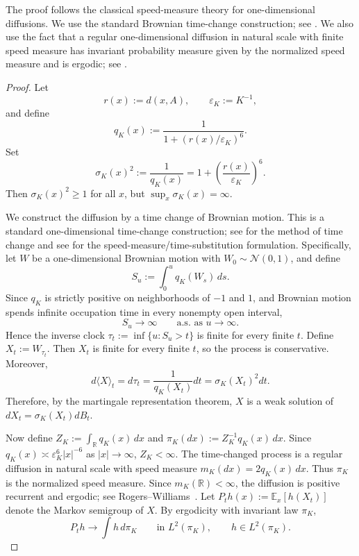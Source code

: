 \documentclass{article}
\newcommand{\1}{\mathbbm{1}}
\numberwithin{equation}{section}
\def\to{\rightarrow}
\begin{document}
The proof follows the classical
speed-measure theory for one-dimensional diffusions. We use the standard
Brownian time-change construction; see 
\cite[Ch.~5, \S5.5A]{KaratzasShreve1991}. We also use the fact that a
regular one-dimensional diffusion in natural scale with finite speed measure
has invariant probability measure given by the normalized speed measure and is
ergodic; see  \cite[Ch.~V, \S\S47,53]{RogersWilliams2000}.

\begin{proof}
Let
$$
r(x):=d(x,A),
\qquad
\varepsilon_K:=K^{-1},
$$
and define
$$
q_K(x):=\frac{1}{1+(r(x)/\varepsilon_K)^6}.
$$
Set
$$
\sigma_K(x)^2:=\frac{1}{q_K(x)}
=
1+\left(\frac{r(x)}{\varepsilon_K}\right)^6.
$$
Then $\sigma_K(x)^2\ge 1$ for all $x$, but $\sup_x \sigma_K(x)=\infty$.

We construct the diffusion by a time change of Brownian motion. This is a standard one-dimensional time-change construction; see
\cite[Ch.~5, \S5.5A]{KaratzasShreve1991} for the
method of time change and see \cite[Ch.~V, \S47]{RogersWilliams2000}
for the speed-measure/time-substitution formulation. Specifically, let $W$ be a one-dimensional Brownian motion with $W_0\sim \mathcal N(0,1)$, and define
$$
S_u:=\int_0^u q_K(W_s)\,ds.
$$
Since $q_K$ is strictly positive on neighborhoods of $-1$ and $1$, and Brownian motion spends infinite occupation time in every nonempty open interval,
$$
S_u\to\infty
\qquad
\text{a.s. as }u\to\infty.
$$
Hence the inverse clock
$
\tau_t:=\inf\{u:S_u>t\}
$
is finite for every finite $t$. Define
$
X_t:=W_{\tau_t}.
$
Then $X_t$ is finite for every finite $t$, so the process is conservative. Moreover,
$$
d\langle X\rangle_t
=
d\tau_t
=
\frac{1}{q_K(X_t)}dt
=
\sigma_K(X_t)^2dt.
$$
Therefore, by the martingale representation theorem, $X$ is a weak solution of $dX_t=\sigma_K(X_t)dB_t$. 

Now define \(Z_K:=\int_{\mathbb R}q_K(x)\,dx\) and
\(\pi_K(dx):=Z_K^{-1}q_K(x)\,dx\). Since
\(q_K(x)\asymp \varepsilon_K^6|x|^{-6}\) as \(|x|\to\infty\), \(Z_K<\infty\).
The time-changed process is a regular diffusion in natural scale with speed
measure \(m_K(dx)=2q_K(x)\,dx\). Thus \(\pi_K\) is the normalized speed
measure. Since \(m_K(\mathbb R)<\infty\), the diffusion is positive recurrent
and ergodic; see Rogers--Williams~\cite[Ch.~V, \S\S47,53]{RogersWilliams2000}. Let \(P_t h(x):=\mathbb E_x[h(X_t)]\) denote the Markov semigroup of \(X\).
By ergodicity with invariant law \(\pi_K\),
\[
P_t h\to \int h\,d\pi_K
\qquad\text{in }L^2(\pi_K),\qquad h\in L^2(\pi_K).
\]



\end{proof}
\end{document}
